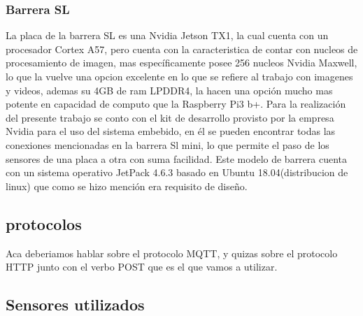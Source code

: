 \subsubsection{Barrera SL}
La placa de la barrera SL es una Nvidia Jetson TX1, la cual cuenta con un procesador Cortex A57, pero cuenta con la caracteristica de contar con nucleos de procesamiento de imagen, mas específicamente posee 256 nucleos Nvidia Maxwell, lo que la vuelve una opcion excelente en lo que se refiere al trabajo con imagenes y videos, ademas su 4GB de ram LPDDR4, la hacen una opción mucho mas potente en capacidad de computo que la Raspberry Pi3 b+.
Para la realización del presente trabajo se conto con el kit de desarrollo provisto por la empresa Nvidia para el uso del sistema embebido, en él se pueden encontrar todas las conexiones mencionadas en la barrera Sl mini, lo que permite el paso de los sensores de una placa a otra con suma facilidad.
Este modelo de barrera cuenta con un sistema operativo JetPack 4.6.3 basado en Ubuntu 18.04(distribucion de linux) que como se hizo mención era requisito de diseño.

\subsection{protocolos}

Aca deberiamos hablar sobre el protocolo MQTT, y quizas sobre el protocolo HTTP junto con el verbo POST que es el que vamos a utilizar.

\subsection{Sensores utilizados}

